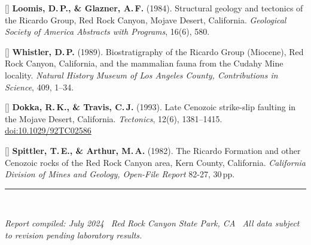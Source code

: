 \documentclass[11pt,a4paper]{article}
\begin{document}
{\setlength{\parskip}{4pt}\setlength{\parindent}{-16pt}\leftskip=16pt\raggedright

[\theequation\label{Loomis1984}]
\textbf{Loomis, D.\,P., \& Glazner, A.\,F.} (1984).
Structural geology and tectonics of the Ricardo Group,
Red Rock Canyon, Mojave Desert, California.
\textit{Geological Society of America Abstracts with Programs}, 16(6), 580.

[\theequation\label{Whistler1989}]
\textbf{Whistler, D.\,P.} (1989).
Biostratigraphy of the Ricardo Group (Miocene), Red Rock Canyon,
California, and the mammalian fauna from the Cudahy Mine locality.
\textit{Natural History Museum of Los Angeles County,
Contributions in Science}, 409, 1--34.

[\theequation\label{Dokka1993}]
\textbf{Dokka, R.\,K., \& Travis, C.\,J.} (1993).
Late Cenozoic strike-slip faulting in the Mojave Desert, California.
\textit{Tectonics}, 12(6), 1381--1415.
\href{https://doi.org/10.1029/92TC02586}{doi:10.1029/92TC02586}

[\theequation\label{Spittler1982}]
\textbf{Spittler, T.\,E., \& Arthur, M.\,A.} (1982).
The Ricardo Formation and other Cenozoic rocks of the Red Rock Canyon area,
Kern County, California.
\textit{California Division of Mines and Geology, Open-File Report} 82-27, 30\,pp.

}

\vspace{8pt}
{\color{terra}\rule{\linewidth}{0.4pt}}\\[3pt]
{\centering\small\color{stone}\itshape
Report compiled: July 2024 \textperiodcentered\
Red Rock Canyon State Park, CA \textperiodcentered\
All data subject to revision pending laboratory results.\par}
\end{document}
